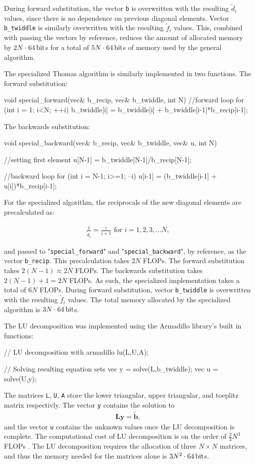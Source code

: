 \documentclass[english,notitlepage,reprint,nofootinbib]{revtex4-1}  %
\begin{document}
During forward substitution, the vector \verb+b+ is overwritten with the resulting \(\tilde{d}_{i}\) values, since there is no dependence on previous diagonal elements. Vector \verb+b_twiddle+ is similarly overwritten with the resulting \(\tilde{f}_{i}\) values. This, combined with passing the vectors by reference, reduces the amount of allocated memory by \(2N\cdot \SI{64}{\bit}\)s for a total of \(5N\cdot \SI{64}{\bit}\)s of memory used by the general algorithm.

The specialized Thomas algorithm is similarly implemented in two functions. The forward substitution:
\begin{cpp}
void special_forward(vec& b_recip, vec& b_twiddle, int N)
{
  //forward loop
  for (int i = 1; i<N; ++i){
    b_twiddle[i] = b_twiddle[i] + b_twiddle[i-1]*b_recip[i-1];
  }
}
\end{cpp}
The backwards substitution:
\begin{cpp}
void special_backward(vec& b_recip, vec& b_twiddle, vec& u, int N)
{
  //setting first element
  u[N-1] = b_twiddle[N-1]/b_recip[N-1];

  //backward loop
  for (int i = N-1; i>=1; --i){
    u[i-1] = (b_twiddle[i-1] + u[i])*b_recip[i-1];
  }
}
\end{cpp}
For the specialized algorithm, the reciprocals of the new diagonal elements are precalculated as:

\begin{align*}
\frac{1}{\tilde{d}_{i}} = \frac{i}{i+1}\text{ for } i=1,2,3,...N,
\end{align*}

and passed to "\verb+special_forward+" and "\verb+special_backward+", by reference, as the vector \verb+b_recip+. This precalculation takes \(2N\) FLOPs. The forward substitution takes \(2(N-1)\approx 2N\) FLOPs. The backwards substitution takes \(2(N-1)+1 = 2N\) FLOPs. As such, the specialized implementation takes a total of \(6N\) FLOPs. During forward substitution, vector \verb+b_twiddle+ is overwritten with the resulting \(\tilde{f}_{i}\) values. The total memory allocated by the specialized algorithm is \(3N\cdot \SI{64}{\bit}\)s.

The LU decomposition was implemented using the Armadillo library's built in functions:
\begin{cpp}
  // LU decomposition with armadillo
  lu(L,U,A);

  // Solving resulting equation sets
  vec y = solve(L,b_twiddle);
  vec u = solve(U,y);
\end{cpp}
The matrices \verb+L+, \verb+U+, \verb+A+ store the lower triangular, upper triangular, and toeplitz matrix respectivly. The vector \verb+y+ contains the solution to
\begin{align*}
\textbf{Ly} = \tilde{\textbf{b}},
\end{align*}
and the vector \verb+u+ contains the unknown values once the LU decomposition is complete. The computational cost of LU decomposition is on the order of \(\frac{2}{3}N^{3}\)FLOPs \citep{Hjorth-Jensen2018}. The LU decomposition requires the allocation of three \(N\times N\) matrices, and thus the memory needed for the matrices alone is \(3N^{2} \cdot \SI{64}{\bit}\)s.
\end{document}
